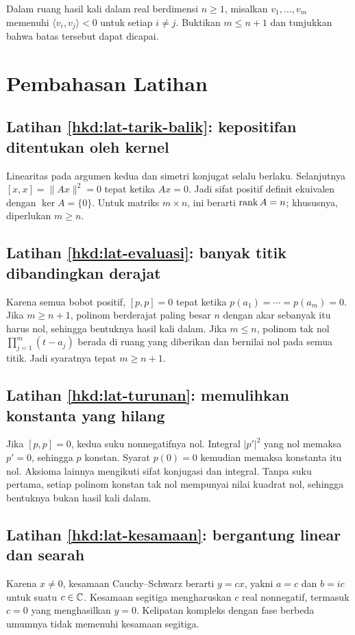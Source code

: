 \begin{latihan}\label{hkd:lat-negatif}
    Dalam ruang hasil kali dalam real berdimensi $n\ge1$,
    misalkan $v_1,\ldots,v_m$ memenuhi
    $\langle v_i,v_j\rangle<0$ untuk setiap $i\ne j$.
    Buktikan $m\le n+1$ dan tunjukkan bahwa batas tersebut dapat dicapai.
\end{latihan}

\ifpembahasan
\section{Pembahasan Latihan}

\subsection*{Latihan \ref{hkd:lat-tarik-balik}: kepositifan ditentukan oleh kernel}
Linearitas pada argumen kedua dan simetri konjugat selalu berlaku.
Selanjutnya $[x,x]=\|Ax\|^2=0$ tepat ketika $Ax=0$.
Jadi sifat positif definit ekuivalen dengan $\ker A=\{0\}$.
Untuk matriks $m\times n$, ini berarti $\operatorname{rank} A=n$;
khususnya, diperlukan $m\ge n$.

\subsection*{Latihan \ref{hkd:lat-evaluasi}: banyak titik dibandingkan derajat}
Karena semua bobot positif, $[p,p]=0$ tepat ketika
$p(a_1)=\cdots=p(a_m)=0$.
Jika $m\ge n+1$, polinom berderajat paling besar $n$ dengan
akar sebanyak itu harus nol, sehingga bentuknya hasil kali dalam.
Jika $m\le n$, polinom tak nol $\prod_{j=1}^m(t-a_j)$
berada di ruang yang diberikan dan bernilai nol pada semua titik.
Jadi syaratnya tepat $m\ge n+1$.

\subsection*{Latihan \ref{hkd:lat-turunan}: memulihkan konstanta yang hilang}
Jika $[p,p]=0$, kedua suku nonnegatifnya nol.
Integral $|p'|^2$ yang nol memaksa $p'=0$, sehingga $p$ konstan.
Syarat $p(0)=0$ kemudian memaksa konstanta itu nol.
Aksioma lainnya mengikuti sifat konjugasi dan integral.
Tanpa suku pertama, setiap polinom konstan tak nol mempunyai
nilai kuadrat nol, sehingga bentuknya bukan hasil kali dalam.

\subsection*{Latihan \ref{hkd:lat-kesamaan}: bergantung linear dan searah}
Karena $x\ne0$, kesamaan Cauchy--Schwarz berarti $y=cx$,
yakni $a=c$ dan $b=ic$ untuk suatu $c\in\mathbb{C}$.
Kesamaan segitiga mengharuskan $c$ real nonnegatif, termasuk
$c=0$ yang menghasilkan $y=0$.
Kelipatan kompleks dengan fase berbeda umumnya tidak memenuhi
kesamaan segitiga.

